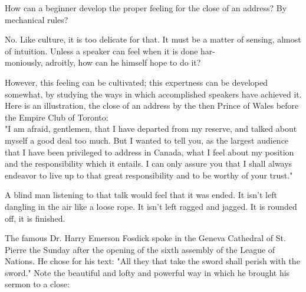 \documentclass[10pt]{article}
\begin{document}
How can a beginner develop the proper feeling for the close of an address? By mechanical rules?

No. Like culture, it is too delicate for that. It must be a matter of sensing, almost of intuition. Unless a speaker can feel when it is done har-\\
moniously, adroitly, how can he himself hope to do it?

However, this feeling can be cultivated; this expertness can be developed somewhat, by studying the ways in which accomplished speakers have achieved it. Here is an illustration, the close of an address by the then Prince of Wales before the Empire Club of Toronto:\\
"I am afraid, gentlemen, that I have departed from my reserve, and talked about myself a good deal too much. But I wanted to tell you, as the largest audience that I have been privileged to address in Canada, what I feel about my position and the responsibility which it entails. I can only assure you that I shall always endeavor to live up to that great responsibility and to be worthy of your trust."

A blind man listening to that talk would feel that it was ended. It isn't left dangling in the air like a loose rope. It isn't left ragged and jagged. It is rounded off, it is finished.

The famous Dr. Harry Emerson Fosdick spoke in the Geneva Cathedral of St. Pierre the Sunday after the opening of the sixth assembly of the League of Nations. He chose for his text: "All they that take the sword shall perish with the sword." Note the beautiful and lofty and powerful way in which he brought his sermon to a close:
\end{document}
